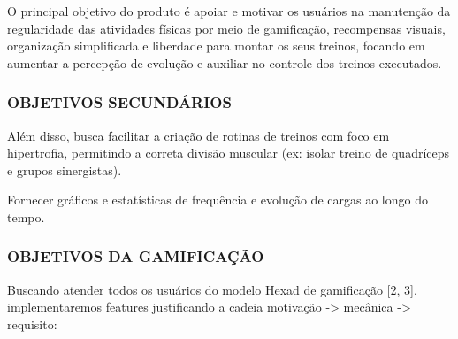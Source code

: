 O principal objetivo do produto é apoiar e motivar os usuários na manutenção da regularidade das atividades físicas por meio de gamificação, recompensas visuais, organização simplificada e liberdade para montar os seus treinos, focando em aumentar a percepção de evolução e auxiliar no controle dos treinos executados.

\subsubsection{OBJETIVOS SECUNDÁRIOS}

Além disso, busca facilitar a criação de rotinas de treinos com foco em hipertrofia, permitindo a correta divisão muscular (ex: isolar treino de quadríceps e grupos sinergistas).

Fornecer gráficos e estatísticas de frequência e evolução de cargas ao longo do tempo.

\subsubsection{OBJETIVOS DA GAMIFICAÇÃO}

Buscando atender todos os usuários do modelo Hexad de gamificação [2, 3], implementaremos features justificando a cadeia motivação -> mecânica -> requisito:

